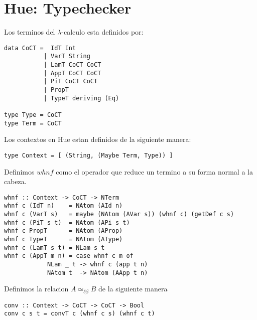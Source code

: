 \section{Hue: Typechecker}
\begin{definition}
Los terminos del $\lambda$-calculo esta definidos por:

\begin{verbatim}
data CoCT =  IdT Int
           | VarT String
           | LamT CoCT CoCT
           | AppT CoCT CoCT
           | PiT CoCT CoCT
           | PropT
           | TypeT deriving (Eq)

type Type = CoCT
type Term = CoCT

\end{verbatim}

\end{definition}

\begin{definition}
Los contextos en Hue estan definidos de la siguiente manera:

\begin{verbatim}
type Context = [ (String, (Maybe Term, Type)) ]
\end{verbatim}

\end{definition}

\begin{definition}
Definimos $whnf$ como el operador que reduce un termino a su forma normal a la cabeza.

\begin{verbatim}
whnf :: Context -> CoCT -> NTerm
whnf c (IdT n)    = NAtom (AId n)
whnf c (VarT s)   = maybe (NAtom (AVar s)) (whnf c) (getDef c s)
whnf c (PiT s t)  = NAtom (APi s t)
whnf c PropT      = NAtom (AProp)
whnf c TypeT      = NAtom (AType)
whnf c (LamT s t) = NLam s t
whnf c (AppT m n) = case whnf c m of
            NLam _ t -> whnf c (app t n)
            NAtom t  -> NAtom (AApp t n)

\end{verbatim}
\end{definition}

\begin{definition}
Definimos la relacion $A \simeq_{\delta\beta} B$ de la siguiente manera

\begin{verbatim}
conv :: Context -> CoCT -> CoCT -> Bool
conv c s t = convT c (whnf c s) (whnf c t)
\end{verbatim}

\end{definition}

